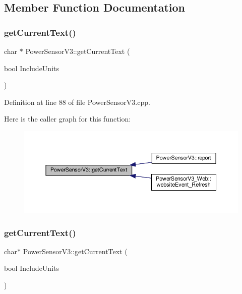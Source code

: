 \subsection{Member Function Documentation}
\mbox{\label{class_power_sensor_v3_afae9ea1a12d8b7fc3eb012b1c38d0639}} 
\subsubsection{\texorpdfstring{get\+Current\+Text()}{getCurrentText()}\hspace{0.1cm}{\footnotesize\ttfamily [1/2]}}
{\footnotesize\ttfamily char $\ast$ Power\+Sensor\+V3\+::get\+Current\+Text (\begin{DoxyParamCaption}\item[{bool}]{Include\+Units }\end{DoxyParamCaption})}



Definition at line 88 of file Power\+Sensor\+V3.\+cpp.

Here is the caller graph for this function\+:
\nopagebreak
\begin{figure}[H]
\begin{center}
\leavevmode
\includegraphics[width=350pt]{class_power_sensor_v3_afae9ea1a12d8b7fc3eb012b1c38d0639_icgraph}
\end{center}
\end{figure}
\mbox{\label{class_power_sensor_v3_ab80cfb01e2669aeb2a57eb27d814ad21}} 
\subsubsection{\texorpdfstring{get\+Current\+Text()}{getCurrentText()}\hspace{0.1cm}{\footnotesize\ttfamily [2/2]}}
{\footnotesize\ttfamily char$\ast$ Power\+Sensor\+V3\+::get\+Current\+Text (\begin{DoxyParamCaption}\item[{bool}]{Include\+Units }\end{DoxyParamCaption})}

